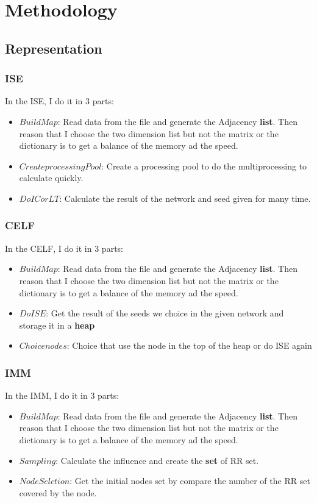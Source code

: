 \documentclass[conference,compsoc]{IEEEtran}
\begin{document}
\section{Methodology}
  \subsection{Representation}
    \subsubsection{ISE}
      In the ISE, I do it in 3 parts:
      \begin{itemize}
        \item $Build Map$: Read data from the file and generate the Adjacency \textbf{list}. Then reason that I choose the two dimension list but not the matrix or the dictionary is to get a balance of the memory ad the speed.
        \item $Create processing Pool$: Create a processing pool to do the multiprocessing to calculate quickly. 
        \item $Do IC or LT$: Calculate the result of the network and seed given for many time.
      \end{itemize}
    \subsubsection{CELF}
      In the CELF, I do it in 3 parts:
      \begin{itemize}
        \item $Build Map$: Read data from the file and generate the Adjacency \textbf{list}. Then reason that I choose the two dimension list but not the matrix or the dictionary is to get a balance of the memory ad the speed.
        \item $Do ISE$: Get the result of the seeds we choice in the given network and storage it in a \textbf{heap}
        \item $Choice nodes$: Choice that use the node in the top of the heap or do ISE again
      \end{itemize}
    \subsubsection{IMM}
      In the IMM, I do it in 3 parts:
      \begin{itemize}
        \item $Build Map$: Read data from the file and generate the Adjacency \textbf{list}. Then reason that I choose the two dimension list but not the matrix or the dictionary is to get a balance of the memory ad the speed.
        \item $Sampling$: Calculate the influence and create the \textbf{set} of RR set.
        \item $Node Selction$: Get the initial nodes set by compare the number of the RR set covered by the node.
      \end{itemize}
\end{document}
